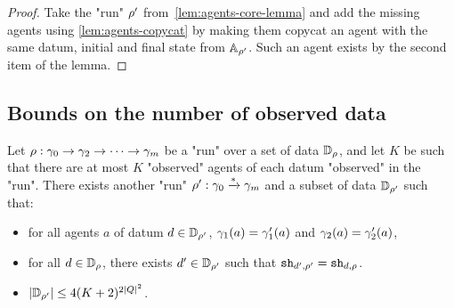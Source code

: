 \begin{proof}
	Take the "run" $\rho'$ from~\cref{lem:agents-core-lemma} and add the missing agents using \cref{lem:agents-copycat} by making them copycat an agent with the same datum, initial and final state from $\mathbb{A}_{\rho'}$. Such an agent exists by the second item of the lemma.
\end{proof}

\subsection{Bounds on the number of observed data}

\begin{lemma}
	\label{lem:data-core-lemma}
	Let $\rho : \gamma_0 \to \gamma_2 \to \cdots \to \gamma_m$ be a "run"  over a set of data $\mathbb{D}_{\rho}$, and let $K$ be such that there are at most $K$ "observed" agents of each datum "observed" in the "run". There exists another "run" $\rho' : \gamma_0 \xrightarrow{*} \gamma_m$ and a subset of data $\mathbb{D}_{\rho'}$ such that:
	\begin{itemize}
		\item for all agents $a$ of datum $d \in \mathbb{D}_{\rho'}$, $\gamma_1(a) = \gamma'_1(a)$ and $\gamma_2(a) = \gamma'_2(a)$,
		
		\item for all $d \in \mathbb{D}_{\rho}$, there exists $d' \in \mathbb{D}_{\rho'}$ such that $\mathtt{sh}_{d',\rho'} = \mathtt{sh}_{d,\rho}$.
		
		\item $|\mathbb{D}_{\rho'}| \leq 4(K+2)^{2|Q|^2}$.
	\end{itemize}
\end{lemma}


